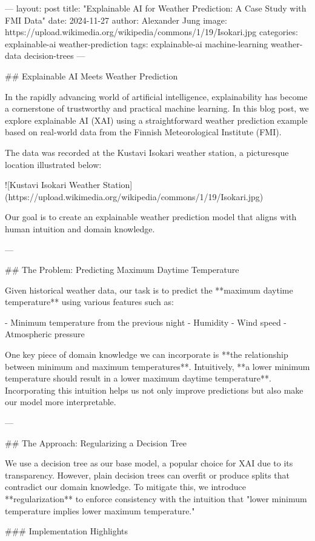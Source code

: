 ---
layout: post
title: "Explainable AI for Weather Prediction: A Case Study with FMI Data"
date: 2024-11-27
author: Alexander Jung
image: https://upload.wikimedia.org/wikipedia/commons/1/19/Isokari.jpg
categories: explainable-ai weather-prediction
tags: explainable-ai machine-learning weather-data decision-trees
---

## Explainable AI Meets Weather Prediction

In the rapidly advancing world of artificial intelligence, explainability has 
become a cornerstone of trustworthy and practical machine learning. In this 
blog post, we explore explainable AI (XAI) using a straightforward weather 
prediction example based on real-world data from the Finnish Meteorological Institute (FMI). 

The data was recorded at the Kustavi Isokari weather station, a picturesque location illustrated below:

![Kustavi Isokari Weather Station](https://upload.wikimedia.org/wikipedia/commons/1/19/Isokari.jpg)

Our goal is to create an explainable weather prediction model that aligns with human intuition and domain knowledge.

---

## The Problem: Predicting Maximum Daytime Temperature

Given historical weather data, our task is to predict the **maximum daytime temperature** using various features such as:

- Minimum temperature from the previous night
- Humidity
- Wind speed
- Atmospheric pressure

One key piece of domain knowledge we can incorporate is **the relationship between minimum and maximum temperatures**. Intuitively, **a lower minimum temperature should result in a lower maximum daytime temperature**. Incorporating this intuition helps us not only improve predictions but also make our model more interpretable.

---

## The Approach: Regularizing a Decision Tree

We use a decision tree as our base model, a popular choice for XAI due to its transparency. However, plain decision trees can overfit or produce splits that contradict our domain knowledge. To mitigate this, we introduce **regularization** to enforce consistency with the intuition that "lower minimum temperature implies lower maximum temperature."

### Implementation Highlights

